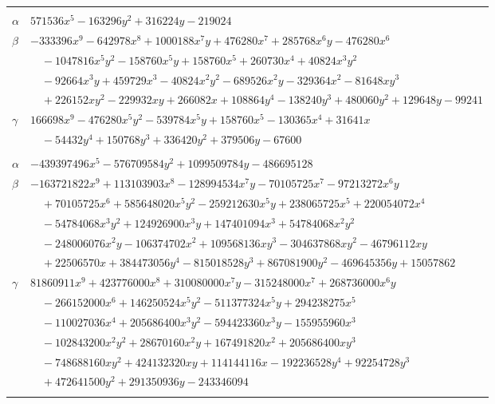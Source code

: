 \documentclass[11pt]{article}
\begin{document}
\begin{longtable}{@{}ll@{}}
\addlinespace[3pt]
\multicolumn{2}{@{}l}{$\{i,j\}=\{17,40\}$, $k_{ij}=2^{7}\cdot 7\cdot 13^{2}$}\\
$\alpha$ & $571536x^{5}-163296y^{2}+316224y-219024$\\
$\beta$ & $-333396x^{9}-642978x^{8}+1000188x^{7}y+476280x^{7}+285768x^{6}y-476280x^{6}$\\
 & $\quad -1047816x^{5}y^{2}-158760x^{5}y+158760x^{5}+260730x^{4}+40824x^{3}y^{2}$\\
 & $\quad -92664x^{3}y+459729x^{3}-40824x^{2}y^{2}-689526x^{2}y-329364x^{2}-81648xy^{3}$\\
 & $\quad +226152xy^{2}-229932xy+266082x+108864y^{4}-138240y^{3}+480060y^{2}+129648y-99241$\\
$\gamma$ & $166698x^{9}-476280x^{5}y^{2}-539784x^{5}y+158760x^{5}-130365x^{4}+31641x$\\
 & $\quad -54432y^{4}+150768y^{3}+336420y^{2}+379506y-67600$\\
\addlinespace[3pt]
\multicolumn{2}{@{}l}{$\{i,j\}=\{17,41\}$, $k_{ij}=2^{2}\cdot 3\cdot 5\cdot 7^{2}$}\\
$\alpha$ & $-439397496x^{5}-576709584y^{2}+1099509784y-486695128$\\
$\beta$ & $-163721822x^{9}+113103903x^{8}-128994534x^{7}y-70105725x^{7}-97213272x^{6}y$\\
 & $\quad +70105725x^{6}+585648020x^{5}y^{2}-259212630x^{5}y+238065725x^{5}+220054072x^{4}$\\
 & $\quad -54784068x^{3}y^{2}+124926900x^{3}y+147401094x^{3}+54784068x^{2}y^{2}$\\
 & $\quad -248006076x^{2}y-106374702x^{2}+109568136xy^{3}-304637868xy^{2}-46796112xy$\\
 & $\quad +22506570x+384473056y^{4}-815018528y^{3}+867081900y^{2}-469645356y+15057862$\\
$\gamma$ & $81860911x^{9}+423776000x^{8}+310080000x^{7}y-315248000x^{7}+268736000x^{6}y$\\
 & $\quad -266152000x^{6}+146250524x^{5}y^{2}-511377324x^{5}y+294238275x^{5}$\\
 & $\quad -110027036x^{4}+205686400x^{3}y^{2}-594423360x^{3}y-155955960x^{3}$\\
 & $\quad -102843200x^{2}y^{2}+28670160x^{2}y+167491820x^{2}+205686400xy^{3}$\\
 & $\quad -748688160xy^{2}+424132320xy+114144116x-192236528y^{4}+92254728y^{3}$\\
 & $\quad +472641500y^{2}+291350936y-243346094$\\
\addlinespace[3pt]

\end{longtable}
\end{document}
